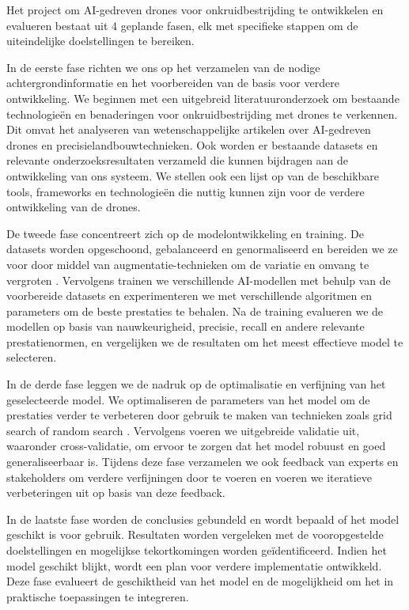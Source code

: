 \documentclass{hogent-article}
\begin{document}
Het project om AI-gedreven drones voor onkruidbestrijding te ontwikkelen en evalueren bestaat uit 4 geplande fasen, elk met specifieke stappen om de uiteindelijke doelstellingen te bereiken.

In de eerste fase richten we ons op het verzamelen van de nodige achtergrondinformatie en het voorbereiden van de basis voor verdere ontwikkeling. We beginnen met een uitgebreid literatuuronderzoek om bestaande technologieën en benaderingen voor onkruidbestrijding met drones te verkennen. Dit omvat het analyseren van wetenschappelijke artikelen over AI-gedreven drones en precisielandbouwtechnieken. Ook worden er bestaande datasets en relevante onderzoeksresultaten verzameld die kunnen bijdragen aan de ontwikkeling van ons systeem. We stellen ook een lijst op van de beschikbare tools, frameworks en technologieën die nuttig kunnen zijn voor de verdere ontwikkeling van de drones.

De tweede fase concentreert zich op de modelontwikkeling en training. De datasets worden opgeschoond, gebalanceerd en genormaliseerd en bereiden we ze voor door middel van augmentatie-technieken om de variatie en omvang te vergroten \autocite{deutsch2020anomaly}. Vervolgens trainen we verschillende AI-modellen met behulp van de voorbereide datasets en experimenteren we met verschillende algoritmen en parameters om de beste prestaties te behalen. Na de training evalueren we de modellen op basis van nauwkeurigheid, precisie, recall en andere relevante prestatienormen, en vergelijken we de resultaten om het meest effectieve model te selecteren.

In de derde fase leggen we de nadruk op de optimalisatie en verfijning van het geselecteerde model. We optimaliseren de parameters van het model om de prestaties verder te verbeteren door gebruik te maken van technieken zoals grid search of random search \autocite{hestisholihah2023hyperparameter}. Vervolgens voeren we uitgebreide validatie uit, waaronder cross-validatie, om ervoor te zorgen dat het model robuust en goed generaliseerbaar is. Tijdens deze fase verzamelen we ook feedback van experts en stakeholders om verdere verfijningen door te voeren en voeren we iteratieve verbeteringen uit op basis van deze feedback. 

In de laatste fase worden de conclusies gebundeld en wordt bepaald of het model geschikt is voor gebruik. Resultaten worden vergeleken met de vooropgestelde doelstellingen en mogelijkse tekortkomingen worden geïdentificeerd. Indien het model geschikt blijkt, wordt een plan voor verdere implementatie ontwikkeld. Deze fase evalueert de geschiktheid van het model en de mogelijkheid om het in praktische toepassingen te integreren.
\end{document}
